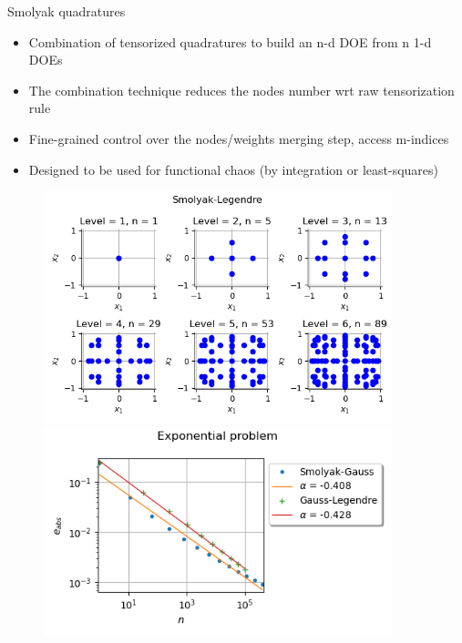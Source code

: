 \documentclass[aspectratio=169]{beamer}
\begin{document}
\begin{frame}{Smolyak quadratures}

\begin{itemize}
\item Combination of tensorized quadratures to build an n-d DOE from n 1-d DOEs
\item The combination technique reduces the nodes number wrt raw tensorization rule
\item Fine-grained control over the nodes/weights merging step, access m-indices
\item Designed to be used for functional chaos (by integration or least-squares)
\end{itemize}

\begin{figure}[!htb]
  \includegraphics[width=0.9\textwidth]{figures/smolyakplot}
\endminipage\hfill
{}
  \includegraphics[width=0.9\textwidth]{figures/sphx_glr_plot_smolyak_quadrature_001}
\endminipage
\end{figure}
\end{frame}
\end{document}
